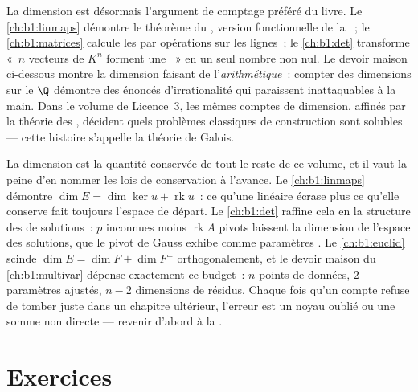\begin{remark}
\label{rem:b1:findim:whereused}
La dimension est désormais l'argument de comptage préféré du livre.
Le \cref{ch:b1:linmaps} démontre le théorème du , version
fonctionnelle de la ~; le \cref{ch:b1:matrices}
calcule les  par opérations sur les lignes~; le \cref{ch:b1:det}
transforme «~$n$ vecteurs de $K^n$ forment une ~» en un seul
nombre non nul. Le devoir maison ci-dessous montre la dimension
faisant de l'\emph{arithmétique}~: compter des dimensions sur le 
$\Q$ démontre des énoncés d'irrationalité qui paraissent inattaquables
à la main. Dans le volume de Licence~3, les mêmes comptes de
dimension, affinés par la théorie des , décident quels
problèmes classiques de construction sont solubles --- cette histoire
s'appelle la théorie de Galois.
\end{remark}

\begin{remark}
\label{rem:b1:findim:perspectives}
La dimension est la quantité conservée de tout le reste de ce volume,
et il vaut la peine d'en nommer les lois de conservation à l'avance.
Le \cref{ch:b1:linmaps} démontre $\dim E = \dim\ker u +
\operatorname{rk} u$~: ce qu'une  linéaire écrase plus ce
qu'elle conserve fait toujours l'espace de départ. Le
\cref{ch:b1:det} raffine cela en la structure des  de
solutions~: $p$ inconnues moins $\operatorname{rk} A$ pivots laissent
la dimension de l'espace des solutions, que le pivot de Gauss exhibe
comme paramètres . Le \cref{ch:b1:euclid} scinde $\dim E = \dim
F + \dim F^\perp$ orthogonalement, et le devoir maison du
\cref{ch:b1:multivar} dépense exactement ce budget~: $n$ points de
données, $2$ paramètres ajustés, $n - 2$ dimensions de résidus.
Chaque fois qu'un compte refuse de tomber juste dans un chapitre
ultérieur, l'erreur est un noyau oublié ou une somme non directe ---
revenir d'abord à la .
\end{remark}

\section{Exercices}

